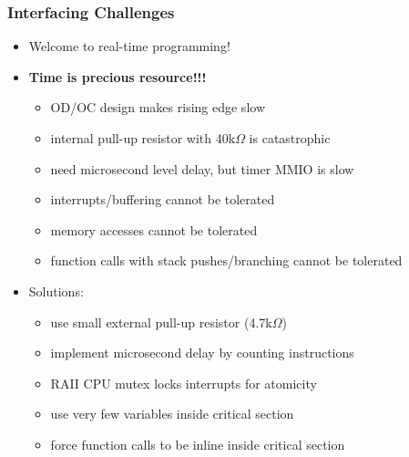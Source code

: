 \documentclass[12pt]{beamer}
\begin{document}
\begin{frame}
    \frametitle{Interfacing Challenges}
    \begin{itemize}
        \item Welcome to real-time programming!
        \item \textbf{Time is precious resource!!!}
              \begin{itemize}
                  \item OD/OC design makes rising edge slow
                  \item internal pull-up resistor with 40k$\Omega$ is catastrophic
                  \item need microsecond level delay, but timer MMIO is slow
                  \item interrupts/buffering cannot be tolerated
                  \item memory accesses cannot be tolerated
                  \item function calls with stack pushes/branching cannot be tolerated
              \end{itemize}
        \item Solutions:
              \begin{itemize}
                  \item use small external pull-up resistor (4.7k$\Omega$)
                  \item implement microsecond delay by counting instructions
                  \item RAII CPU mutex locks interrupts for atomicity
                  \item use very few variables inside critical section
                  \item force function calls to be inline inside critical section
              \end{itemize}
    \end{itemize}
\end{frame}
\end{document}
